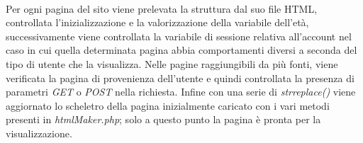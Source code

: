 \paragraph{}
Per ogni pagina del sito viene prelevata la struttura dal suo file HTML, controllata l'inizializzazione e la valorizzazione della variabile dell'età, successivamente viene controllata la variabile di sessione relativa all'account nel caso in cui quella determinata pagina abbia comportamenti diversi a seconda del tipo di utente che la visualizza. Nelle pagine raggiungibili da più fonti, viene verificata la pagina di provenienza dell'utente e quindi controllata la presenza di parametri \textit{GET} o \textit{POST} nella richiesta. Infine con una serie di \textit{str\textunderscore replace()} viene aggiornato lo scheletro della pagina inizialmente caricato con i vari metodi presenti in \textit{htmlMaker.php}; solo a questo punto la pagina è pronta per la visualizzazione.